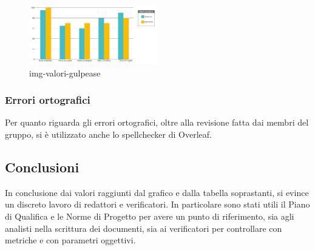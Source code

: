 \newpage
\begin{figure}[H]
    \centering
    \includegraphics[width=0.5\textwidth]{source/sections/images/gulpeaseGrafico.JPG}
    \caption{img-valori-gulpease}
\end{figure}


\subsubsection{Errori ortografici}

Per quanto riguarda gli errori ortografici, oltre alla revisione fatta dai membri del gruppo, si è utilizzato anche lo spellchecker di Overleaf.


\subsection{Conclusioni}

In conclusione dai valori raggiunti dal grafico e dalla tabella soprastanti, si evince un discreto lavoro di redattori e verificatori. In particolare sono stati utili il Piano di Qualifica e le Norme di Progetto per avere un punto di riferimento, sia agli analisti nella scrittura dei documenti, sia ai verificatori per controllare con metriche e con parametri oggettivi.


